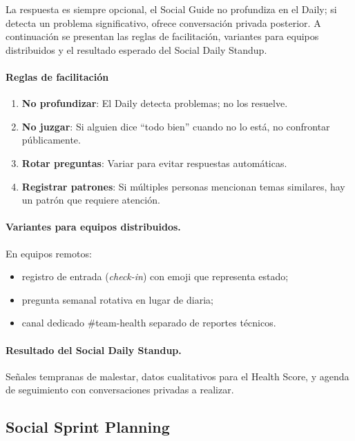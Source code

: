 La respuesta es siempre opcional, el Social Guide no profundiza en el Daily; si detecta un problema significativo, ofrece conversación privada posterior. A continuación se presentan las reglas de facilitación, variantes para equipos distribuidos y el resultado esperado del Social Daily Standup.

\paragraph{Reglas de facilitación}
\begin{enumerate}
    \item \textbf{No profundizar}: El Daily detecta problemas; no los resuelve.
    \item \textbf{No juzgar}: Si alguien dice ``todo bien'' cuando no lo está, no confrontar públicamente.
    \item \textbf{Rotar preguntas}: Variar para evitar respuestas automáticas.
    \item \textbf{Registrar patrones}: Si múltiples personas mencionan temas similares, hay un patrón que requiere atención.
\end{enumerate}

\paragraph{Variantes para equipos distribuidos.}

En equipos remotos:
\begin{itemize}
    \item registro de entrada (\textit{check-in}) con emoji que representa estado;
    \item pregunta semanal rotativa en lugar de diaria;
    \item canal dedicado \#team-health separado de reportes técnicos.
\end{itemize}

\paragraph{Resultado del Social Daily Standup.}

Señales tempranas de malestar, datos cualitativos para el Health Score, y agenda de seguimiento con conversaciones privadas a realizar.

\subsection{Social Sprint Planning}

